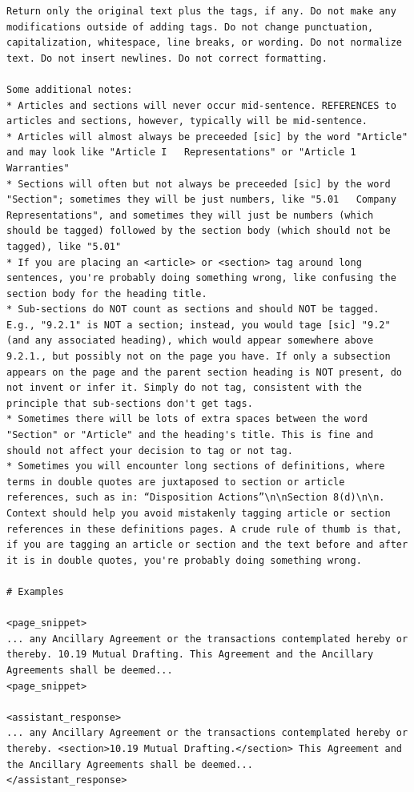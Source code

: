 \documentclass[12pt]{article}
\begin{document}
{\begin{appendices}
\begin{verbatim}
Return only the original text plus the tags, if any. Do not make any modifications outside of adding tags. Do not change punctuation, capitalization, whitespace, line breaks, or wording. Do not normalize text. Do not insert newlines. Do not correct formatting.

Some additional notes:
* Articles and sections will never occur mid-sentence. REFERENCES to articles and sections, however, typically will be mid-sentence.
* Articles will almost always be preceeded [sic] by the word "Article" and may look like "Article I   Representations" or "Article 1  Warranties"
* Sections will often but not always be preceeded [sic] by the word "Section"; sometimes they will be just numbers, like "5.01   Company Representations", and sometimes they will just be numbers (which should be tagged) followed by the section body (which should not be tagged), like "5.01"
* If you are placing an <article> or <section> tag around long sentences, you're probably doing something wrong, like confusing the section body for the heading title.
* Sub-sections do NOT count as sections and should NOT be tagged. E.g., "9.2.1" is NOT a section; instead, you would tage [sic] "9.2" (and any associated heading), which would appear somewhere above 9.2.1., but possibly not on the page you have. If only a subsection appears on the page and the parent section heading is NOT present, do not invent or infer it. Simply do not tag, consistent with the principle that sub-sections don't get tags.
* Sometimes there will be lots of extra spaces between the word "Section" or "Article" and the heading's title. This is fine and should not affect your decision to tag or not tag.
* Sometimes you will encounter long sections of definitions, where terms in double quotes are juxtaposed to section or article references, such as in: “Disposition Actions”\n\nSection 8(d)\n\n. Context should help you avoid mistakenly tagging article or section references in these definitions pages. A crude rule of thumb is that, if you are tagging an article or section and the text before and after it is in double quotes, you're probably doing something wrong.

# Examples

<page_snippet>
... any Ancillary Agreement or the transactions contemplated hereby or thereby. 10.19 Mutual Drafting. This Agreement and the Ancillary Agreements shall be deemed...
<page_snippet>

<assistant_response>
... any Ancillary Agreement or the transactions contemplated hereby or thereby. <section>10.19 Mutual Drafting.</section> This Agreement and the Ancillary Agreements shall be deemed...
</assistant_response>


\end{verbatim}
\end{appendices}}
\end{document}
